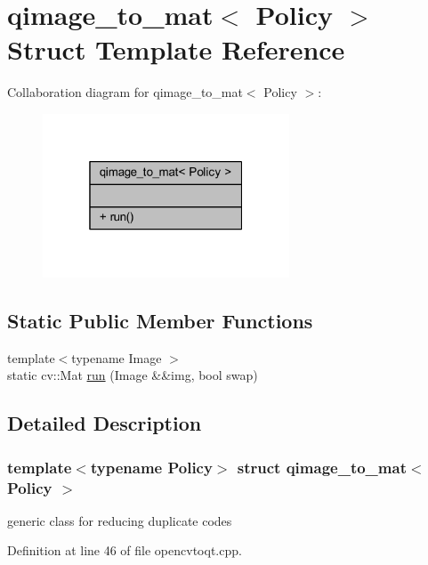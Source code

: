 \hypertarget{structqimage__to__mat}{}\section{qimage\+\_\+to\+\_\+mat$<$ Policy $>$ Struct Template Reference}
\label{structqimage__to__mat}


Collaboration diagram for qimage\+\_\+to\+\_\+mat$<$ Policy $>$\+:
\nopagebreak
\begin{figure}[H]
\begin{center}
\leavevmode
\includegraphics[width=208pt]{structqimage__to__mat__coll__graph}
\end{center}
\end{figure}
\subsection*{Static Public Member Functions}
\begin{DoxyCompactItemize}
\item 
{\footnotesize template$<$typename Image $>$ }\\static cv\+::\+Mat \hyperlink{structqimage__to__mat_abd72ef7629c43797b7afd8deb3e4b4b1}{run} (Image \&\&img, bool swap)
\end{DoxyCompactItemize}


\subsection{Detailed Description}
\subsubsection*{template$<$typename Policy$>$\newline
struct qimage\+\_\+to\+\_\+mat$<$ Policy $>$}

generic class for reducing duplicate codes 

Definition at line 46 of file opencvtoqt.\+cpp.



